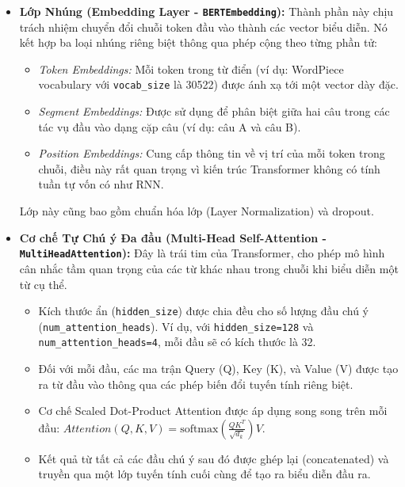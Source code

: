 \begin{itemize}
    \item \textbf{Lớp Nhúng (Embedding Layer - \texttt{BERTEmbedding}):} Thành phần này chịu trách nhiệm chuyển đổi chuỗi token đầu vào thành các vector biểu diễn. Nó kết hợp ba loại nhúng riêng biệt thông qua phép cộng theo từng phần tử:
    \begin{itemize}
        \item \textit{Token Embeddings:} Mỗi token trong từ điển (ví dụ: WordPiece vocabulary với \texttt{vocab\_size} là 30522) được ánh xạ tới một vector dày đặc.
        \item \textit{Segment Embeddings:} Được sử dụng để phân biệt giữa hai câu trong các tác vụ đầu vào dạng cặp câu (ví dụ: câu A và câu B).
        \item \textit{Position Embeddings:} Cung cấp thông tin về vị trí của mỗi token trong chuỗi, điều này rất quan trọng vì kiến trúc Transformer không có tính tuần tự vốn có như RNN.
    \end{itemize}
    Lớp này cũng bao gồm chuẩn hóa lớp (Layer Normalization) và dropout.

    \item \textbf{Cơ chế Tự Chú ý Đa đầu (Multi-Head Self-Attention - \texttt{MultiHeadAttention}):} Đây là trái tim của Transformer, cho phép mô hình cân nhắc tầm quan trọng của các từ khác nhau trong chuỗi khi biểu diễn một từ cụ thể.
    \begin{itemize}
        \item Kích thước ẩn (\texttt{hidden\_size}) được chia đều cho số lượng đầu chú ý (\texttt{num\_attention\_heads}). Ví dụ, với \texttt{hidden\_size=128} và \texttt{num\_attention\_heads=4}, mỗi đầu sẽ có kích thước là 32.
        \item Đối với mỗi đầu, các ma trận Query (Q), Key (K), và Value (V) được tạo ra từ đầu vào thông qua các phép biến đổi tuyến tính riêng biệt.
        \item Cơ chế Scaled Dot-Product Attention được áp dụng song song trên mỗi đầu: $Attention(Q, K, V) = \text{softmax}(\frac{QK^T}{\sqrt{d_k}})V$.
        \item Kết quả từ tất cả các đầu chú ý sau đó được ghép lại (concatenated) và truyền qua một lớp tuyến tính cuối cùng để tạo ra biểu diễn đầu ra.
    \end{itemize}


\end{itemize}
